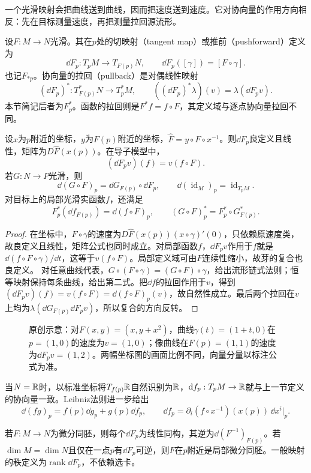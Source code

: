 一个光滑映射会把曲线送到曲线，因而把速度送到速度。它对协向量的作用方向相反：先在目标测量速度，再把测量拉回源流形。
\begin{definition}[切映射与协向量拉回]
设$F:M\to N$光滑。其在$p$处的切映射（tangent map）或推前（pushforward）定义为
\[
 \dd F_p:T_pM\to T_{F(p)}N,\qquad
 \dd F_p([\gamma])=[F\circ\gamma].
\]
也记$F_{*p}$。协向量的拉回（pullback）是对偶线性映射
\[
 (\dd F_p)^*:T_{F(p)}^*N\to T_p^*M,\qquad
 ((\dd F_p)^*\lambda)(v)=\lambda(\dd F_pv).
\]
本节简记后者为$F_p^*$。函数的拉回则是$F^*f=f\circ F$，其定义域与逐点协向量拉回不同。
\end{definition}
\begin{theorem}\label{thm:manifold-differential}
设$x$为$p$附近的坐标，$y$为$F(p)$附近的坐标，$\widehat F=y\circ F\circ x^{-1}$。则$\dd F_p$良定义且线性，矩阵为$D\widehat F(x(p))$。在导子模型中，
\[
 (\dd F_pv)(f)=v(f\circ F).
\]
若$G:N\to P$光滑，则
\[
 \dd(G\circ F)_p=\dd G_{F(p)}\circ\dd F_p,
 \qquad \dd(\operatorname{id}_M)_p=\operatorname{id}_{T_pM}.
\]
对目标上的局部光滑实函数$f$，还满足
\[
 F_p^*(\dd f_{F(p)})=\dd(f\circ F)_p,
 \qquad (G\circ F)_p^*=F_p^*\circ G_{F(p)}^*.
\]
\end{theorem}
\begin{proof}
在坐标中，$F\circ\gamma$的速度为$D\widehat F(x(p))(x\circ\gamma)'(0)$，只依赖原速度类，故良定义且线性，矩阵公式也同时成立。对局部函数$f$，$\dd F_pv$作用于$f$就是$\dd(f\circ F\circ\gamma)/\dd t$，这等于$v(f\circ F)$。局部定义域可由$F$连续性缩小，故芽的复合也良定义。
对任意曲线代表，$G\circ(F\circ\gamma)=(G\circ F)\circ\gamma$，给出流形链式法则；恒等映射保持每条曲线，给出第二式。把$\dd f$的拉回作用于$v$，得到$(\dd F_pv)(f)=v(f\circ F)=\dd(f\circ F)_p(v)$，故自然性成立。最后两个拉回在$v$上均为$\lambda(\dd G_{F(p)}\dd F_pv)$，所以复合的方向反转。
\end{proof}
\begin{figure}[htbp]
\centering

\caption{原创示意：对$F(x,y)=(x,y+x^2)$，曲线$\gamma(t)=(1+t,0)$在$p=(1,0)$的速度为$v=(1,0)$；像曲线在$F(p)=(1,1)$的速度为$\dd F_pv=(1,2)$。两幅坐标图的画面比例不同，向量分量以标注公式为准。}
\label{fig:tangent-map}
\end{figure}
当$N=\mathbb{R}$时，以标准坐标将$T_{f(p)}\mathbb{R}$自然识别为$\mathbb{R}$，$\mathrm{d} f_p:T_pM\to\mathbb{R}$就与上一节定义的协向量一致。Leibniz法则进一步给出
\[
 \dd(fg)_p=f(p)\dd g_p+g(p)\dd f_p,
 \qquad\dd f_p=\partial_i(f\circ x^{-1})(x(p))\,\dd x^i|_p.
\]
\begin{corollary}[微分同胚的切映射与秩]\label{cor:diffeo-tangent}
若$F:M\to N$为微分同胚，则每个$\dd F_p$为线性同构，其逆为$\dd(F^{-1})_{F(p)}$。若$\dim M=\dim N$且仅在一点$p$有$\dd F_p$可逆，则$F$在$p$附近是局部微分同胚。一般映射的秩定义为$\operatorname{rank}\dd F_p$，不依赖选卡。
\end{corollary}
